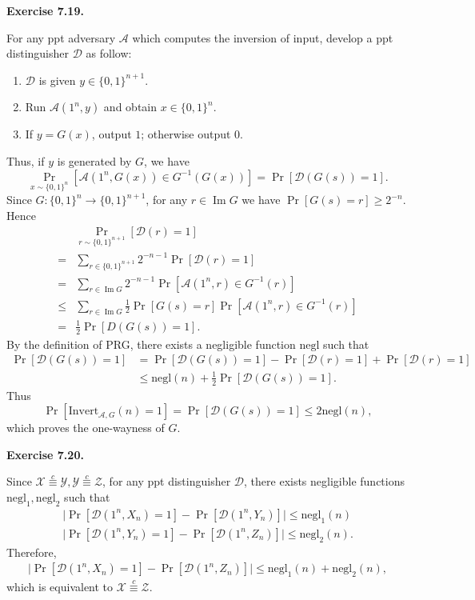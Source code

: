 \documentclass[a4paper]{article}
\newenvironment{exercise}[1]{
	\par
	\noindent\textbf{Exercise #1.}\quad
}{
	\par
	\bigskip
}
\DeclareMathOperator{\Image}{\mathop{Im}}
\newcommand{\sbra}[1]{\left[ #1 \right]}
\newcommand{\bin}{\{0,1\}}
\newcommand{\Invert}{\mathrm{Invert}}
\newcommand{\negl}{\mathrm{negl}}
\newcommand{\ppt}{{\sc ppt} }
\newcommand{\Acal}{\mathcal{A}}
\newcommand{\Xcal}{\mathcal{X}}
\newcommand{\Ycal}{\mathcal{Y}}
\newcommand{\Zcal}{\mathcal{Z}}
\newcommand{\Dcal}{\mathcal{D}}
\begin{document}
\begin{exercise}{7.19}
    For any \ppt adversary $\Acal$ which computes the inversion of input, develop a \ppt distinguisher $\Dcal$ as follow:
    \begin{enumerate}
        \item $\Dcal$ is given $y\in\bin^{n+1}$.
        \item Run $\Acal(1^n,y)$ and obtain $x\in\bin^n$.
        \item If $y=G(x)$, output $1$; otherwise output $0$.
    \end{enumerate}
    Thus, if $y$ is generated by $G$, we have
    $$
        \Pr_{x\sim\bin^n}\sbra{\Acal(1^n,G(x))\in G^{-1}(G(x))}=\Pr\sbra{\Dcal(G(s))=1}.
    $$
    Since $G:\bin^n\to\bin^{n+1}$, for any $r\in\Image G$ we have $\Pr\sbra{G(s)=r}\geq 2^{-n}$.
    Hence
    \begin{align*}
        &\Pr_{r\sim\bin^{n+1}}\sbra{\Dcal(r)=1}\\
        =&\sum_{r\in\bin^{n+1}}2^{-n-1}\Pr\sbra{\Dcal(r)=1}\\
        =&\sum_{r\in\Image G}2^{-n-1}\Pr\sbra{\Acal(1^n,r)\in G^{-1}(r)}\\
        \leq&\sum_{r\in\Image G}\frac12\Pr\sbra{G(s)=r}\Pr\sbra{\Acal(1^n,r)\in G^{-1}(r)}\\
        =&\frac12\Pr\sbra{D(G(s))=1}.
    \end{align*}
    By the definition of PRG, there exists a negligible function $\negl$ such that
    \begin{align*}
        \Pr\sbra{\Dcal(G(s))=1}
        &=\Pr\sbra{\Dcal(G(s))=1}-\Pr\sbra{\Dcal(r)=1}+\Pr\sbra{\Dcal(r)=1}\\
        &\leq\negl(n)+\frac12\Pr\sbra{\Dcal(G(s))=1}.
    \end{align*}
    Thus
    $$
    \Pr\sbra{\Invert_{\Acal,G}(n)=1}=\Pr\sbra{\Dcal(G(s))=1}\leq2\negl(n),
    $$
    which proves the one-wayness of $G$.
\end{exercise}

\begin{exercise}{7.20}
    Since $\Xcal\overset{c}{\equiv}\Ycal,\Ycal\overset{c}{\equiv}\Zcal$, for any \ppt distinguisher $\Dcal$, there
    exists negligible functions $\negl_1,\negl_2$ such that
    \begin{gather*}
        \Big|\Pr\sbra{\Dcal(1^n,X_n)=1}-\Pr\sbra{\Dcal(1^n,Y_n)}\Big|\leq\negl_1(n)\\
        \Big|\Pr\sbra{\Dcal(1^n,Y_n)=1}-\Pr\sbra{\Dcal(1^n,Z_n)}\Big|\leq\negl_2(n).
    \end{gather*}
    Therefore,
    \begin{gather*}
        \Big|\Pr\sbra{\Dcal(1^n,X_n)=1}-\Pr\sbra{\Dcal(1^n,Z_n)}\Big|\leq\negl_1(n)+\negl_2(n),
    \end{gather*}
    which is equivalent to $\Xcal\overset{c}{\equiv}\Zcal$.
\end{exercise}
\end{document}
